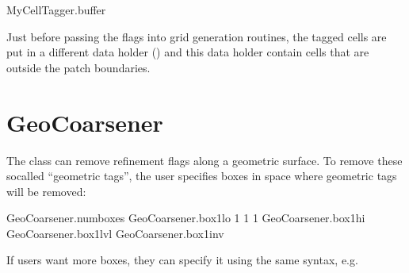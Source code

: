 \documentclass[letterpaper,10pt,english]{sphinxmanual}
\begin{document}
\begin{sphinxVerbatim}[commandchars=\\\{\},formatcom=\scriptsize]
MyCellTagger.buffer   
\end{sphinxVerbatim}

\sphinxAtStartPar
Just before passing the flags into  grid generation routines, the tagged cells are put in a different data holder () and this data holder  contain cells that are outside the patch boundaries.

\sphinxstepscope


\section{GeoCoarsener}
\label{\detokenize{Source/GeoCoarsener:geocoarsener}}\label{\detokenize{Source/GeoCoarsener:chap-geocoarsener}}\label{\detokenize{Source/GeoCoarsener::doc}}
\sphinxAtStartPar
The  class can remove refinement flags along a geometric surface.
To remove these so\sphinxhyphen{}called “geometric tags”, the user specifies boxes in space where geometric tags will be removed:

\begin{sphinxVerbatim}[commandchars=\\\{\},formatcom=\scriptsize]
GeoCoarsener.num\PYGZus{}boxes                
GeoCoarsener.box1\PYGZus{}lo      \PYGZhy{}1 \PYGZhy{}1 \PYGZhy{}1     
GeoCoarsener.box1\PYGZus{}hi                
GeoCoarsener.box1\PYGZus{}lvl                 
GeoCoarsener.box1\PYGZus{}inv             
\end{sphinxVerbatim}

\sphinxAtStartPar
If users want more boxes, they can specify it using the same syntax, e.g.
\end{document}
